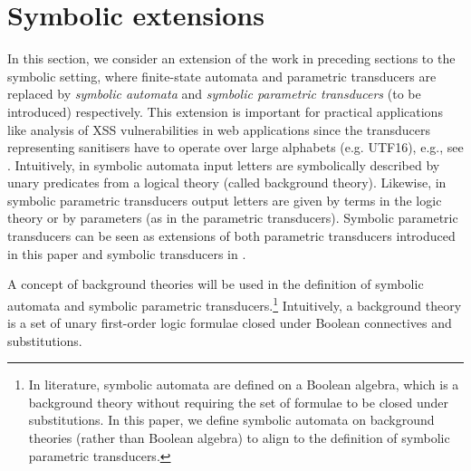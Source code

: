 
\section{Symbolic extensions}
\label{sec:symbolic}

In this section, we consider an extension of the work in preceding sections to the symbolic setting, where finite-state automata and parametric transducers are replaced by \emph{symbolic automata} \cite{NG01,DV14} and \emph{symbolic parametric transducers} (to be introduced) respectively.
This extension is important for
practical applications like analysis of XSS vulnerabilities in web applications
since the transducers representing sanitisers have to operate over
large alphabets (e.g. UTF16), e.g., see \cite{DV13,symbolic-transducer,BEK}.
%
Intuitively, in symbolic automata %
input letters are symbolically described by unary predicates from a logical theory (called background theory). %
%
Likewise, in symbolic parametric transducers %
output letters are given by terms in the logic theory or by parameters (as in the parametric transducers).
Symbolic parametric transducers can be seen as extensions of both parametric
transducers introduced in this paper and symbolic transducers in
\cite{symbolic-transducer}.


A concept of background theories will be used in the definition of symbolic automata and symbolic parametric transducers.\footnote{In literature, symbolic automata are defined on a Boolean algebra, which is a background theory without requiring the set of formulae to be closed under substitutions. In this paper, we define symbolic automata on background theories (rather than Boolean algebra) to align to the definition of symbolic parametric transducers.}
Intuitively, 
a background theory is a set of unary first-order logic formulae closed under Boolean connectives and substitutions. 
 
